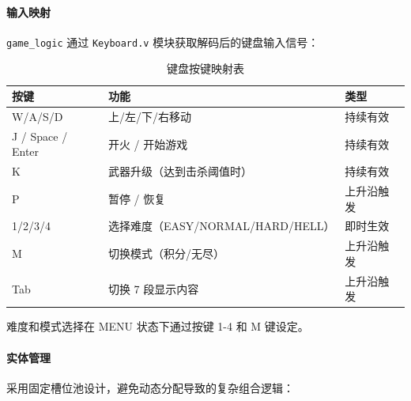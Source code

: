 \documentclass[12pt,a4paper]{ctexart}
\begin{document}
\paragraph{输入映射}

\texttt{game\_logic} 通过 \texttt{Keyboard.v} 模块获取解码后的键盘输入信号：

\begin{table}[H]
\centering
\caption{键盘按键映射表}
\label{tab:input}
\begin{tabular}{lll}
\toprule
\textbf{按键} & \textbf{功能} & \textbf{类型} \\
\midrule
W/A/S/D  & 上/左/下/右移动    & 持续有效 \\
J / Space / Enter & 开火 / 开始游戏   & 持续有效 \\
K        & 武器升级（达到击杀阈值时） & 持续有效 \\
P        & 暂停 / 恢复        & 上升沿触发 \\
1/2/3/4  & 选择难度（EASY/NORMAL/HARD/HELL） & 即时生效 \\
M        & 切换模式（积分/无尽）  & 上升沿触发 \\
Tab      & 切换 7 段显示内容    & 上升沿触发 \\
\bottomrule
\end{tabular}
\end{table}

难度和模式选择在 MENU 状态下通过按键 1-4 和 M 键设定。

\paragraph{实体管理}

采用固定槽位池设计，避免动态分配导致的复杂组合逻辑：
\end{document}
